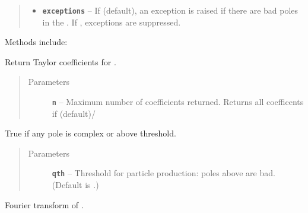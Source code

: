 \documentclass[letterpaper,10pt,english]{sphinxmanual}
\begin{document}
\begin{fulllineitems}
\begin{quote}
\begin{description}
\begin{itemize}
\item {} 
\textbf{\texttt{exceptions}} -- If  (default), an exception is raised if there
are bad poles in the . If , exceptions are
suppressed.

\end{itemize}

\end{description}\end{quote}

Methods include:

\begin{fulllineitems}
\label{g2tools:g2tools.vacpol.taylor}
Return Taylor coefficients for .
\begin{quote}\begin{description}
\item[{Parameters}] \leavevmode
\textbf{\texttt{n}} -- Maximum number of coefficients returned. Returns
all coefficents if  (default)/

\end{description}\end{quote}

\end{fulllineitems}


\begin{fulllineitems}
\label{g2tools:g2tools.vacpol.badpoles}
True if any pole is complex or above threshold.
\begin{quote}\begin{description}
\item[{Parameters}] \leavevmode
\textbf{\texttt{qth}} -- Threshold for particle production: poles above 
are bad. (Default is .)

\end{description}\end{quote}

\end{fulllineitems}


\begin{fulllineitems}
\label{g2tools:g2tools.vacpol.FT}
Fourier transform of .


\end{fulllineitems}
\end{fulllineitems}
\end{document}
